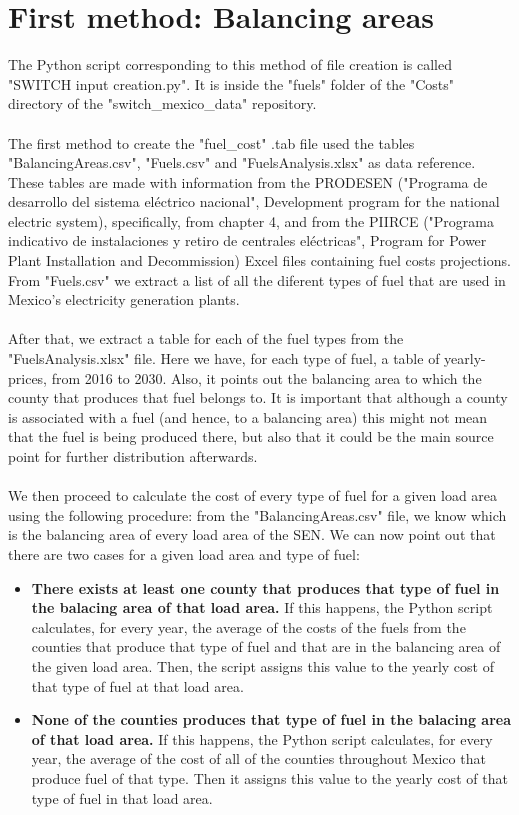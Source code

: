 \documentclass{article}
\begin{document}
\section{First method: Balancing areas}
The Python script corresponding to this method of file creation is called "SWITCH input creation.py". It is inside the "fuels" folder of the "Costs" directory of the "switch\_mexico\_data" repository.
\\
\\The first method to create the "fuel\_cost" .tab file used  the tables  "BalancingAreas.csv", "Fuels.csv" and "FuelsAnalysis.xlsx" as data reference. These tables are made with information from the PRODESEN ("Programa de desarrollo del sistema eléctrico nacional", Development program for the national electric system)\cite{prodesen}, specifically, from chapter 4\cite{prodesen4}, and from the PIIRCE ("Programa indicativo de instalaciones y retiro de centrales eléctricas", Program for Power Plant Installation and Decommission) Excel files containing fuel costs projections\cite{piircef}. From "Fuels.csv" we extract a list of all the diferent types of fuel that are used in Mexico's electricity generation plants.
\\
\\After that, we extract a table for each of the fuel types from the "FuelsAnalysis.xlsx" file. Here we have, for each type of fuel, a table of yearly-prices, from 2016 to 2030. Also, it points out the balancing area to which the county that produces that fuel belongs to. It is important that although a county is associated with a fuel (and hence, to a balancing area) this might not mean that the fuel is being produced there, but also that it could be the main source point for further distribution afterwards.
\\
\\We then proceed to calculate the cost of every type of fuel for a given load area using the following procedure: from the "BalancingAreas.csv" file, we know which is the balancing area of every load area of the SEN. We can now point out that there are two cases for a given load area and type of fuel:
\begin{itemize}
\item \textbf{There exists at least one county that produces that type of fuel in the balacing area of that load area.} If this happens, the Python script calculates, for every year, the average of the costs of the fuels from the counties that produce that type of fuel and that are in the balancing area of the given load area. Then, the script assigns this value to the yearly cost of that type of fuel at that load area.
\item \textbf{None of the counties produces that type of fuel in the balacing area of that load area.} If this happens, the Python script calculates, for every year, the average of the cost of all of the counties throughout Mexico that produce fuel of that type. Then it assigns this value to the yearly cost of that type of fuel in that load area.
\end{itemize}
\end{document}

